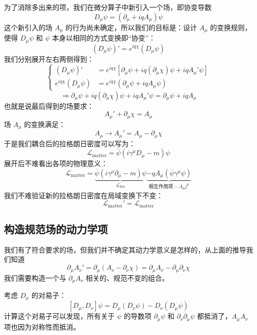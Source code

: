 \documentclass[UTF8]{ctexbook}
\begin{document}
为了消除多出来的项，我们在微分算子中新引入一个场，即协变导数
\[
D_{\mu}\psi=\left( \partial_{\mu}+iqA_{\mu} \right)\psi
\]
这个新引入的场 $A_{\mu}$ 的行为尚未确定，所以我们的目标是：设计 $A_{\mu}$ 的变换规则，使得 $D_{\mu}\psi$ 和 $\psi$ 本身以相同的方式变换即“协变”：
\[
\left( D_{\mu}\psi \right)'=e^{iq\chi}\left( D_{\mu}\psi \right)
\]
我们分别展开左右两侧得到：
\[
\left\{
\begin{aligned}
\left( D_{\mu}\psi \right)' &= e^{iq\chi}\left[ \partial_{\mu}\psi+iq\left( \partial_{\mu}\chi \right)\psi+iqA_{\mu}'\psi \right]\\
e^{iq\chi}\left( D_{\mu}\psi \right) &= e^{iq\chi}\left( \partial_{\mu}\psi+iqA_{\mu}\psi \right)
\end{aligned}
\right.
\]
\[
\Rightarrow \partial_{\mu}\psi+iq\left( \partial_{\mu}\chi \right)\psi+iqA_{\mu}'\psi=\partial_{\mu}\psi+iqA_{\mu}
\]
也就是说最后得到的场要求：
\[
A_{\mu}'+\partial_{\mu}\chi=A_{\mu}
\]
场 $A_{\mu}$ 的变换满足：
\[
\boxed{A_{\mu}\to A_{\mu}'=A_{\mu}-\partial_{\mu}\chi}
\]
于是我们耦合后的拉格朗日密度可以写为：
\[
\mathcal{L}_{\text{matter}}=\overline{\psi}\left( i\gamma^{\mu}D_{\mu}-m \right)\psi
\]
展开后不难看出各项的物理意义：
\[
\mathcal{L}_{\text{matter}}
=\underbrace{\overline{\psi}\left( i\gamma^{\mu}\partial_{\mu}-m \right)\psi}_{\mathcal{L}_{\text{free}}}
\underbrace{-qA_{\mu}\left( \overline{\psi}\gamma^{\mu}\psi \right)}_{\text{相互作用项}-A_{\mu}j^{\mu}}
\]
我们不难验证新的拉格朗日密度在局域变换下不变：
\[
\mathcal{L}_{\text{matter}}'=\mathcal{L}_{\text{matter}}
\]

\subsection{构造规范场的动力学项}

我们有了符合要求的场，但我们并不确定其动力学意义是怎样的，从上面的推导我们知道
\[
\partial_{\mu}A_{\nu}'=\partial_{\mu}\left( A_{\nu}-\partial_{\nu}\chi \right)=\partial_{\mu}A_{\nu}-\partial_{\mu}\partial_{\nu}\chi
\]
我们需要构造一个与 $\partial_{\mu}A_{\nu}$ 相关的、规范不变的组合。

考虑 $D_{\mu}$ 的对易子：
\[
\left[ D_{\mu},D_{\nu} \right]\psi=D_{\mu}\left( D_{\nu}\psi \right)-D_{\nu}\left( D_{\mu}\psi \right)
\]
计算这个对易子可以发现，所有关于 $\psi$ 的导数项 $\partial_{\mu}\psi$ 和 $\partial_{\nu}\partial_{\mu}\psi$ 都抵消了，$A_{\mu}A_{\nu}$ 项也因为对称性而抵消。
\end{document}
